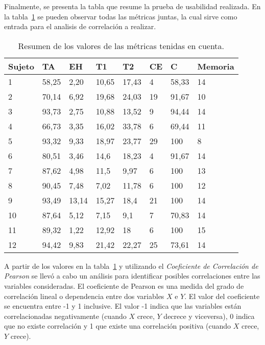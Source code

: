 Finalmente, se presenta la tabla que resume la prueba de usabilidad realizada. En la tabla~\ref{sec:tabla-resumen-prueba}
se pueden observar todas las m\'etricas juntas, la cual sirve como entrada para el analisis de correlaci\'on a realizar.

\begin{table}[H]
\centering
\footnotesize
\begin{tabular}{|p{1.6cm}|p{1.6cm}|p{1.6cm}|p{1.6cm}|p{1.6cm}|p{1.6cm}|p{1.6cm}|p{1.6cm}|}
\hline
    Sujeto & TA    &    EH & T1    & T2  & CE &  C    & Memoria \\
    \hline 
    1      & 58,25 & 2,20  & 10,65 & 17,43 & 4  & 58,33 & 14 \\
    2      & 70,14 & 6,92  & 19,68 & 24,03 & 19 & 91,67 & 10 \\
    3      & 93,73 & 2,75  & 10,88 & 13,52 & 9  & 94,44 & 14 \\
    4      & 66,73 & 3,35  & 16,02 & 33,78 & 6  & 69,44 & 11 \\
    5      & 93,32 & 9,33  & 18,97 & 23,77 & 29 & 100   & 8  \\
    6      & 80,51 & 3,46  & 14,6  & 18,23 & 4  & 91,67 & 14 \\
    7      & 87,62 & 4,98  &  11,5 & 9,97  & 6  & 100   & 13 \\
    8      & 90,45 & 7,48  & 7,02  & 11,78 & 6  & 100   & 12 \\
    9      & 93,49 & 13,14 & 15,27 & 18,4  & 21 & 100   & 14 \\
    10     & 87,64 & 5,12  & 7,15  & 9,1   & 7  & 70,83 & 14 \\
    11     & 89,32 & 1,22  & 12,92 & 18    & 6  & 100   & 15 \\
    12     & 94,42 & 9,83  & 21,42 & 22,27 & 25 & 73,61 & 14 \\
\hline
\end{tabular}
\caption{Resumen de los valores de las métricas tenidas en cuenta.}
\label{sec:tabla-resumen-prueba}
\end{table}

A partir de los valores en la tabla~\ref{sec:tabla-resumen-prueba} y utilizando el \emph{Coeficiente de 
Correlaci\'on de Pearson}\cite{BoslaughStatistics2008} se llev\'o a cabo un an\'alisis  para identificar posibles
correlaciones entre las variables consideradas. El coeficiente de Pearson es una medida del grado de 
correlaci\'on lineal o dependencia entre dos variables $X$ e $Y$. El valor del coeficiente se encuentra entre
-1 y 1 inclusive. El valor -1 indica que las variables est\'an correlacionadas negativamente 
(cuando $X$ crece, $Y$ decrece y viceversa), 0 indica que no existe correlaci\'on y 1 que existe una correlaci\'on
positiva (cuando $X$ crece, $Y$ crece).

